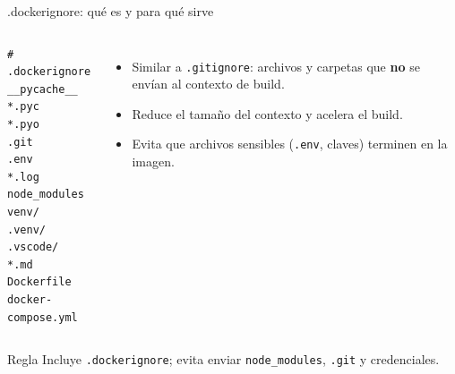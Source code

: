 \documentclass[aspectratio=169]{beamer}
\begin{document}
\begin{frame}[fragile]{.dockerignore: qué es y para qué sirve}
  \footnotesize
  \begin{columns}[c]
\begin{lstlisting}[style=terminal, basicstyle=\ttfamily\scriptsize]
# .dockerignore
__pycache__
*.pyc
*.pyo
.git
.env
*.log
node_modules
venv/
.venv/
.vscode/
*.md
Dockerfile
docker-compose.yml
\end{lstlisting}
    \begin{itemize}
      \item Similar a \texttt{.gitignore}: archivos y carpetas que \textbf{no} se envían al contexto de build.
      \item Reduce el tamaño del contexto y acelera el build.
      \item Evita que archivos sensibles (\texttt{.env}, claves) terminen en la imagen.
    \end{itemize}
  \end{columns}
  \vspace{-0.05cm}
  \begin{alertblock}{Regla}
    Incluye \texttt{.dockerignore}; evita enviar \texttt{node\_modules}, \texttt{.git} y credenciales.
  \end{alertblock}
\end{frame}
\end{document}
